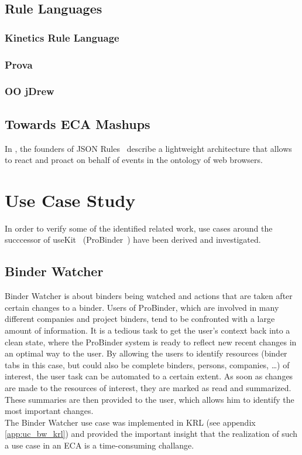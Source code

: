 \documentclass[11pt]{article}%
\begin{document}
\subsection{Rule Languages}
\subsubsection{Kinetics Rule Language}

\subsubsection{Prova}


\subsubsection{OO jDrew}


\subsection{Towards ECA Mashups}
In \cite{2009-Pascalau_Giurca-LWAECARE.pdf}, the founders of JSON Rules~\cite{2008-Giurca_Pascalau-JSON_Rules.pdf} describe a lightweight architecture that allows to react and proact on behalf of events in the ontology of web browsers.



\section{Use Case Study}
In order to verify some of the identified related work, use cases around the succcessor of useKit~\cite{2010-Rizzotti_Burkhart-useKit.pdf} (ProBinder~\cite{wwwprobinder}) have been derived and investigated. 

\subsection{Binder Watcher}
Binder Watcher is about binders being watched and actions that are taken after certain changes to a binder. Users of ProBinder, which are involved in many different companies and project binders, tend to be confronted with a large amount of information. It is a tedious task to get the user's context back into a clean state, where the ProBinder system is ready to reflect new recent changes in an optimal way to the user. By allowing the users to identify resources (binder tabs in this case, but could also be complete binders, persons, companies, \dots) of interest, the user task can be automated to a certain extent. As soon as changes are made to the resources of interest, they are marked as read and summarized. These summaries are then provided to the user, which allows him to identify the most important changes.
\\
The Binder Watcher use case was implemented in KRL (see appendix \ref{app:uc_bw_krl}) and provided the important insight that the realization of such a use case in an ECA is a time-consuming challange. 
\end{document}
